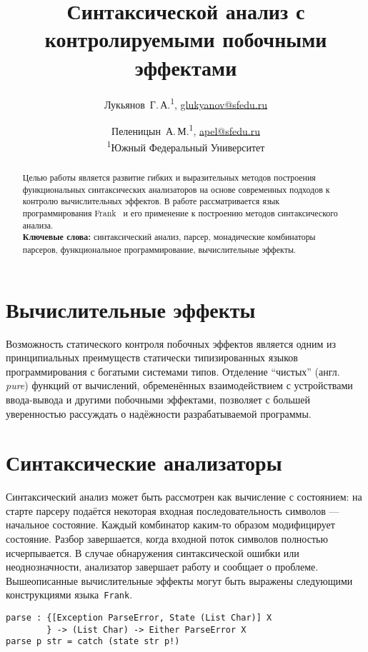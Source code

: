 \documentclass [a4paper] {article}
\title %
  {Синтаксической анализ с контролируемыми побочными эффектами}
\author %
{%
  Лукьянов~Г.\,А.\textsuperscript {1}, \url {glukyanov@sfedu.ru} \and %
  Пеленицын~А.\,М.\textsuperscript {1}, \url {apel@sfedu.ru} \\
  \textsuperscript {1}Южный Федеральный Университет
}%
\date {}    %
\begin{document}

\maketitle

\begin {abstract}
  Целью работы является развитие гибких и выразительных методов построения функциональных синтаксических анализаторов на основе современных подходов к контролю вычислительных эффектов. В работе рассматривается язык 
  программирования Frank~\cite{Frank} и его применение к построению методов
  синтаксического анализа.  
  \\ \textbf {Ключевые слова:} синтаксический анализ, парсер, монадические комбинаторы парсеров, функциональное программирование, вычислительные эффекты.
\end {abstract}

\section{Вычислительные эффекты}

Возможность статического контроля побочных эффектов является одним из
принципиальных преимуществ статически типизированных языков
программирования с богатыми системами типов. Отделение ``чистых''
(англ. \emph{pure}) функций от вычислений, обременённых
взаимодействием с устройствами ввода-вывода и другими побочными
эффектами, позволяет с большей уверенностью рассуждать о надёжности
разрабатываемой программы.

\section{Синтаксические анализаторы}

Синтаксический анализ может быть рассмотрен как вычисление с состоянием:
на старте парсеру подаётся некоторая входная последовательность символов --- 
начальное состояние. Каждый комбинатор каким-то образом модифицирует
состояние. Разбор завершается, когда входной поток символов полностью
исчерпывается. В случае обнаружения синтаксической ошибки или
неоднозначности, анализатор завершает работу и сообщает о проблеме.
Вышеописанные вычислительные эффекты могут быть выражены следующими
конструкциями языка~\texttt{Frank}.    

\begin{verbatim}
parse : {[Exception ParseError, State (List Char)] X
        } -> (List Char) -> Either ParseError X
parse p str = catch (state str p!)
\end{verbatim}
\end{document}
